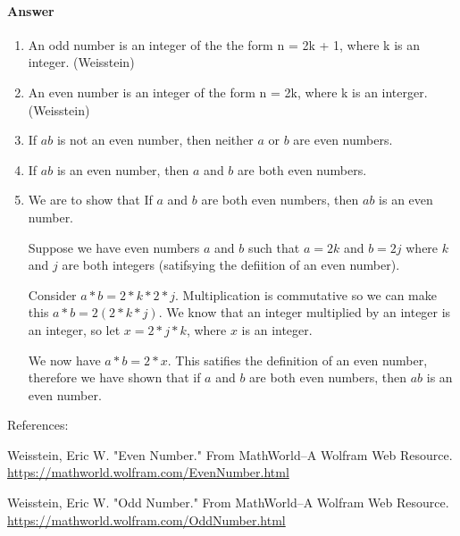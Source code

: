\documentclass{article}
\begin{document}
\paragraph{Answer}

\begin{enumerate}
    \item An odd number is an integer of the the form n = 2k + 1, where k is an integer. (Weisstein)
    \item An even number is an integer of the form n = 2k, where k is an interger. (Weisstein)
    \item If $ab$ is not an even number, then neither $a$ or $b$ are even numbers. 
    \item If $ab$ is an even number, then $a$ and $b$ are both even numbers. 
    \item We are to show that If $a$ and $b$ are both even numbers, then $ab$ is
    an even number.

    Suppose we have even numbers $a$ and $b$ such that $a = 2k$ and $b = 2j$ where $k$ and $j$ are both integers (satifsying the defiition of an even number).

    Consider $a*b = 2*k*2*j$. Multiplication is commutative so we can make this $a*b = 2(2*k*j)$. We know that an integer multiplied by an integer is an integer, so let $x = 2*j*k$, where $x$ is an integer. 

    We now have $a*b = 2*x$. This satifies the definition of an even number, therefore we have shown that if $a$ and $b$ are both even numbers, then $ab$ is
    an even number.
\end{enumerate}
References: 

Weisstein, Eric W. "Even Number." From MathWorld--A Wolfram Web Resource. \url{https://mathworld.wolfram.com/EvenNumber.html}

Weisstein, Eric W. "Odd Number." From MathWorld--A Wolfram Web Resource. \url{https://mathworld.wolfram.com/OddNumber.html}
\end{document}
